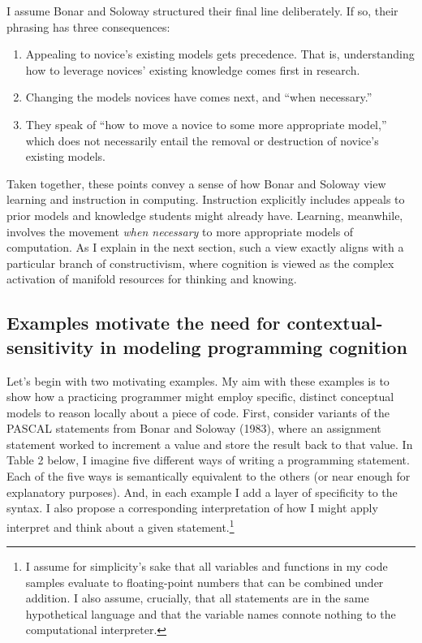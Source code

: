 I assume Bonar and Soloway structured their final line deliberately. If
so, their phrasing has three consequences:

\begin{enumerate}
\def\labelenumi{\arabic{enumi}.}
\item
  Appealing to novice's existing models gets precedence. That is,
  understanding how to leverage novices' existing knowledge comes first
  in research.
\item
  Changing the models novices have comes next, and ``when necessary.''
\item
  They speak of ``how to move a novice to some more appropriate model,''
  which does not necessarily entail the removal or destruction of
  novice's existing models.
\end{enumerate}

Taken together, these points convey a sense of how Bonar and Soloway
view learning and instruction in computing. Instruction explicitly
includes appeals to prior models and knowledge students might already
have. Learning, meanwhile, involves the movement \emph{when necessary}
to more appropriate models of computation. As I explain in the next
section, such a view exactly aligns with a particular branch of
constructivism, where cognition is viewed as the complex activation of
manifold resources for thinking and knowing.

\subsection{Examples motivate the need for contextual-sensitivity in
modeling programming
cognition}\label{examples-motivate-the-need-for-contextual-sensitivity-in-modeling-programming-cognition}

Let's begin with two motivating examples. My aim with these examples is
to show how a practicing programmer might employ specific, distinct
conceptual models to reason locally about a piece of code. First,
consider variants of the PASCAL statements from Bonar and Soloway
(1983), where an assignment statement worked to increment a value and
store the result back to that value. In Table 2 below, I imagine five
different ways of writing a programming statement. Each of the five ways
is semantically equivalent to the others (or near enough for explanatory
purposes). And, in each example I add a layer of specificity to the
syntax. I also propose a corresponding interpretation of how I might
apply interpret and think about a given statement.\footnote{I assume for
  simplicity's sake that all variables and functions in my code samples
  evaluate to floating-point numbers that can be combined under
  addition. I also assume, crucially, that all statements are in the
  same hypothetical language and that the variable names connote nothing
  to the computational interpreter.}

